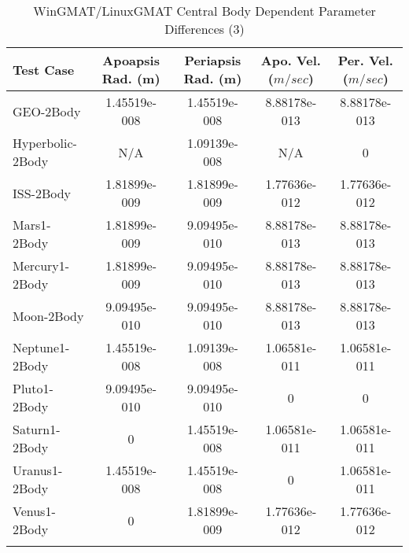 \begin{table}[htbp!]
\centering
\caption{ WinGMAT/LinuxGMAT Central Body Dependent Parameter Differences (3)}
      \begin{tabular}{lcccc}
      \hline\hline
          Test Case & Apoapsis Rad. (m) & Periapsis Rad. (m) & Apo. Vel. ($m/sec$) & Per. Vel. ($m/sec$) \\
         \hline
         GEO-2Body & 1.45519e-008 & 1.45519e-008 & 8.88178e-013 & 8.88178e-013 \\
         Hyperbolic-2Body & N/A & 1.09139e-008 & N/A & 0 \\
         ISS-2Body & 1.81899e-009 & 1.81899e-009 & 1.77636e-012 & 1.77636e-012 \\
         Mars1-2Body & 1.81899e-009 & 9.09495e-010 & 8.88178e-013 & 8.88178e-013 \\
         Mercury1-2Body & 1.81899e-009 & 9.09495e-010 & 8.88178e-013 & 8.88178e-013 \\
         Moon-2Body & 9.09495e-010 & 9.09495e-010 & 8.88178e-013 & 8.88178e-013 \\
         Neptune1-2Body & 1.45519e-008 & 1.09139e-008 & 1.06581e-011 & 1.06581e-011 \\
         Pluto1-2Body & 9.09495e-010 & 9.09495e-010 & 0 & 0 \\
         Saturn1-2Body & 0 & 1.45519e-008 & 1.06581e-011 & 1.06581e-011 \\
         Uranus1-2Body & 1.45519e-008 & 1.45519e-008 & 0 & 1.06581e-011 \\
         Venus1-2Body & 0 & 1.81899e-009 & 1.77636e-012 & 1.77636e-012 \\
      \hline\hline
      \label{Table: WinGMAT-LinuxGMAT CB Parameters Set 3} 
\end{tabular}
\end{table}

